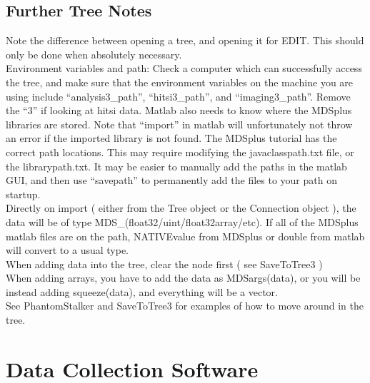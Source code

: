 \documentclass[twoside]{article}
\begin{document}
\subsection{Further Tree Notes}
\hspace*{4ex}Note the difference between opening a tree, and opening it for EDIT. This should only be done when absolutely necessary. \\
\hspace*{4ex}Environment variables and path: Check a computer which can successfully access the tree, and make sure that the environment variables on the machine you are using include “analysis3\_path”, “hitsi3\_path”, and “imaging3\_path”. Remove the “3” if looking at hitsi data. Matlab also needs to know where the MDSplus libraries are stored. Note that “import” in matlab will unfortunately not throw an error if the imported library is not found. The MDSplus tutorial has the correct path locations. This may require modifying the javaclasspath.txt file, or the librarypath.txt. It may be easier to manually add the paths in the matlab GUI, and then use “savepath” to permanently add the files to your path on startup.\\
\hspace*{4ex}Directly on import ( either from the Tree object or the Connection object ), the data will be of type MDS\_(float32/uint/float32array/etc). If all of the MDSplus matlab files are on the path, NATIVEvalue from MDSplus or double from matlab will convert to a usual type.\\
\hspace*{4ex}When adding data into the tree, clear the node first ( see SaveToTree3 )\\
\hspace*{4ex}When adding arrays, you have to add the data as  MDSargs(data), or you will be instead adding squeeze(data), and everything will be a vector.\\
See PhantomStalker and SaveToTree3 for examples of how to move around in the tree.
 

\section{Data Collection Software}
\end{document}
